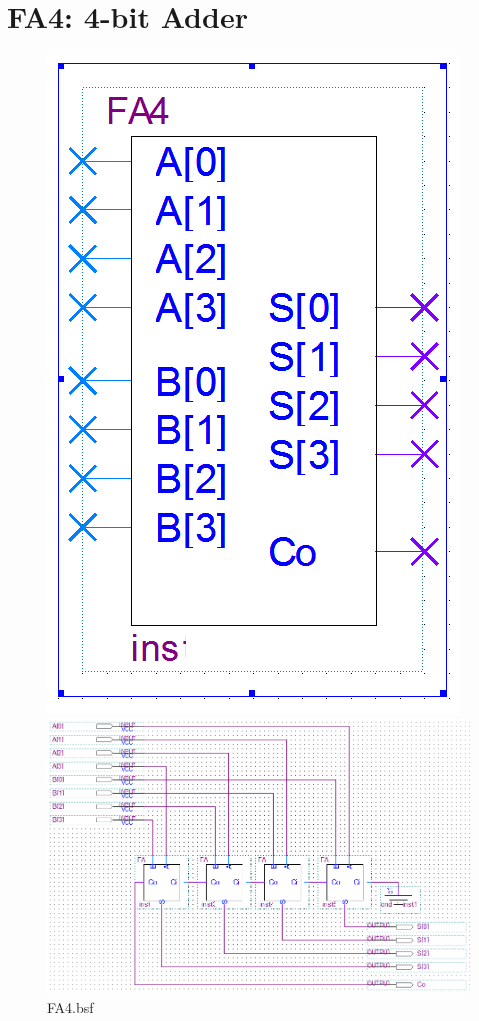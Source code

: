 \documentclass[12pt,a4paper]{article}
\begin{document}
  \section{FA4: 4-bit Adder}
  \begin{figure}[H]
    \centering
    \begin{subcaptionblock}{0.15\linewidth}
      \includegraphics[width=\linewidth]{FA4_bsf.png}
      \caption{FA4.bsf}
    \end{subcaptionblock}
    \begin{subcaptionblock}{0.84\linewidth}
      \includegraphics[width=\linewidth]{FA4_bdf.png}

\end{subcaptionblock}
\end{figure}
\end{document}
